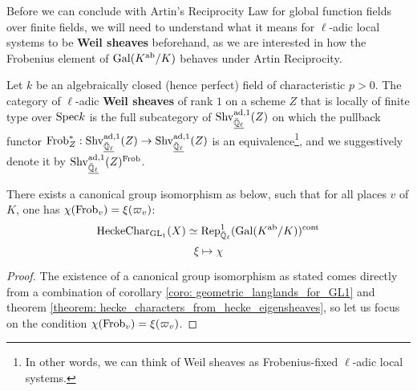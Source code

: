             Before we can conclude with Artin's Reciprocity Law for global function fields over finite fields, we will need to understand what it means for $\ell$-adic local systems to be \textbf{Weil sheaves} beforehand, as we are interested in how the Frobenius element of $\mathrm{Gal}(K^{\mathrm{ab}}/K)$ behaves under Artin Reciprocity.
            \begin{definition} \label{def: weil_sheaves}
                Let $k$ be an algebraically closed (hence perfect) field of characteristic $p > 0$. The category of $\ell$-adic \textbf{Weil sheaves} of rank $1$ on a scheme $Z$ that is locally of finite type over $\mathrm{Spec} k$ is the full subcategory of $\mathrm{Shv}_{\underline{\bar{\mathbb{Q}}_{\ell}}}^{\mathrm{ad}, 1}(Z)$ on which the pullback functor $\mathrm{Frob}_Z^*: \mathrm{Shv}_{\underline{\bar{\mathbb{Q}}_{\ell}}}^{\mathrm{ad}, 1}(Z) \to \mathrm{Shv}_{\underline{\bar{\mathbb{Q}}_{\ell}}}^{\mathrm{ad}, 1}(Z)$ is an equivalence\footnote{In other words, we can think of Weil sheaves as Frobenius-fixed $\ell$-adic local systems.}, and we suggestively denote it by $\mathrm{Shv}_{\underline{\bar{\mathbb{Q}}_{\ell}}}^{\mathrm{ad}, 1}(Z)^{\mathrm{Frob}}$.
            \end{definition}
            \begin{theorem} \label{theorem: artin_reciprocity_for_global_function_fields}
                There exists a canonical group isomorphism as below, such that for all places $v$ of $K$, one has $\chi(\mathrm{Frob}_v) = \xi(\varpi_v)$:
                    $$\mathrm{Hecke}\mathrm{Char}_{\operatorname{GL}_1}(X) \simeq \mathrm{Rep}^1_{\bar{\mathbb{Q}}_{\ell}}(\mathrm{Gal}(K^{\mathrm{ab}}/K))^{\mathrm{cont}}$$
                    $$\xi \mapsto \chi$$
            \end{theorem}
                \begin{proof}
                    The existence of a canonical group isomorphism as stated comes directly from a combination of corollary \ref{coro: geometric_langlands_for_GL1} and theorem \ref{theorem: hecke_characters_from_hecke_eigensheaves}, so let us focus on the  condition $\chi(\mathrm{Frob}_v) = \xi(\varpi_v)$.
                \end{proof}